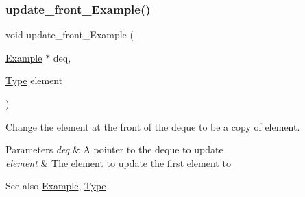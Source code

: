 \subsubsection{\texorpdfstring{update\+\_\+front\+\_\+\+Example()}{update\_front\_Example()}}
{\footnotesize\ttfamily void update\+\_\+front\+\_\+\+Example (\begin{DoxyParamCaption}\item[{\hyperlink{structExample}{Example} $\ast$}]{deq,  }\item[{\hyperlink{group__DEQUE_gac9c83c2070eb6b5891cf742b90f54c68}{Type}}]{element }\end{DoxyParamCaption})}



Change the element at the front of the deque to be a copy of element. 


\begin{DoxyParams}{Parameters}
{\em deq} & A pointer to the deque to update\\
\hline
{\em element} & The element to update the first element to\\
\hline
\end{DoxyParams}
\begin{DoxySeeAlso}{See also}
\hyperlink{structExample}{Example}, \hyperlink{group__DEQUE_gac9c83c2070eb6b5891cf742b90f54c68}{Type} 
\end{DoxySeeAlso}

